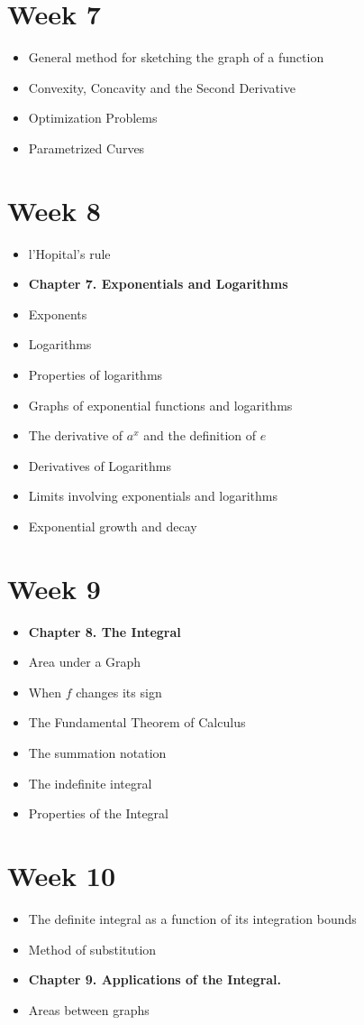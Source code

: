 \documentclass{amsproc}
\begin{document}
\section*{Week 7}
\begin{itemize}
\item General method for sketching the graph of a function
\item Convexity, Concavity and the Second Derivative
\item Optimization Problems
\item Parametrized Curves
\end{itemize}

\section*{Week 8}
\begin{itemize}
\item l'Hopital's rule
\item \textbf{Chapter 7. Exponentials and Logarithms}
\item Exponents
\item Logarithms
\item Properties of logarithms
\item Graphs of exponential functions and logarithms
\item The derivative of $a^x$ and the definition of $e$
\item Derivatives of Logarithms
\item Limits involving exponentials and logarithms
\item Exponential growth and decay
\end{itemize}

\section*{Week 9}
\begin{itemize}
\item \textbf{Chapter 8. The Integral}
\item Area under a Graph
\item When $f$ changes its sign
\item The Fundamental Theorem of Calculus
\item The summation notation
\item The indefinite integral
\item Properties of the Integral
\end{itemize}

\section*{Week 10}
\begin{itemize}
\item The definite integral as a function of its integration bounds
\item Method of substitution
\item \textbf{Chapter 9. Applications of the Integral.}
\item Areas between graphs
\end{itemize}
\end{document}

